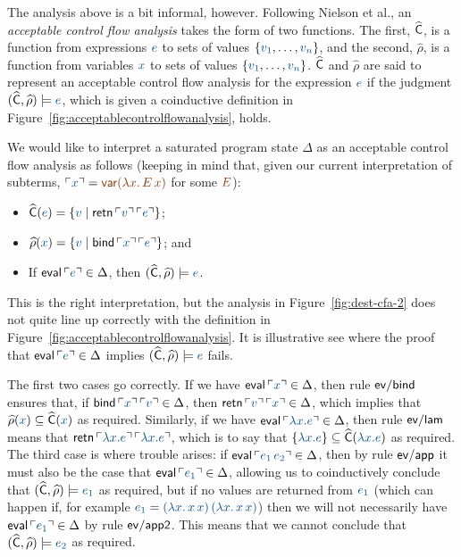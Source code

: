 The analysis above is a bit informal, however. Following Nielson et
al., an {\it acceptable control flow analysis} takes the form of two
functions. The first, $\widehat{\sf C}$, is a function from
expressions $\obj{e}$ to sets of values $\{\obj{v_1},
\ldots,\obj{v_n}\}$, and the second, $\widehat{\rho}$, is a function
from variables $\obj{x}$ to sets of values $\{\obj{v_1},
\ldots,\obj{v_n}\}$. $\widehat{\sf C}$ and $\widehat{\rho}$ are said
to represent an acceptable control flow analysis for the expression
$\obj{e}$ if the judgment $(\widehat{\sf C},\widehat{\rho}) \models
\obj{e}$, which is given a coinductive definition in
Figure~\ref{fig:acceptablecontrolflowanalysis}, holds.

We would like to interpret a saturated program state $\Delta$ as an
acceptable control flow analysis as follows (keeping in mind that,
given our current interpretation of subterms, $\interp{x} = \lf{{\sf
    var}(\lambda x.\,E\,x)}$ for some $\lf{E}$): \smallskip
\begin{itemize}
\item $\widehat{\sf C}(\obj{e}) = \{ \obj{v} \mid {\sf retn}\,\interp{v}\,\interp{e} \}$;
\item $\widehat{\rho}(\obj{x}) = \{ \obj{v} \mid {\sf bind}\,\interp{x}\,\interp{e} \}$; and
\item If ${\sf eval}\,\interp{e} \in \Delta$, then $(\widehat{\sf C},\widehat{\rho}) \models \obj{e}$.
\end{itemize}
\smallskip This is the right interpretation, but the analysis in
Figure~\ref{fig:dest-cfa-2} does not quite line up correctly with the
definition in Figure~\ref{fig:acceptablecontrolflowanalysis}. It is
illustrative see where the proof that ${\sf eval}\,\interp{e} \in
\Delta$ implies $(\widehat{\sf C},\widehat{\rho}) \models \obj{e}$
fails.

The first two cases go correctly. If we have ${\sf eval}\,\interp{x}
\in \Delta$, then rule ${\sf ev/bind}$ ensures that, if ${\sf
  bind}\,\interp{x}\,\interp{v} \in \Delta$, then ${\sf
  retn}\,\interp{v}\,\interp{x} \in \Delta$, which implies that
$\widehat{\rho}(\obj{x}) \subseteq \widehat{\sf C}(\obj{x})$ as
required.  Similarly, if we have ${\sf eval}\,\interp{\lambda x.e} \in
\Delta$, then rule ${\sf ev/lam}$ means that ${\sf
  retn}\,\interp{\lambda x.e}\,\interp{\lambda x.e}$, which is to say
that $\{\obj{\lambda x.e} \} \subseteq \widehat{\sf C}(\obj{\lambda
  x.e})$ as required. The third case is where trouble arises: if ${\sf
  eval}\,\interp{e_1\,e_2} \in \Delta$, then by rule ${\sf ev/app}$ it
must also be the case that ${\sf eval}\,\interp{e_1} \in \Delta$,
allowing us to coinductively conclude that $(\widehat{\sf
  C},\widehat{\rho}) \models \obj{e_1}$ as required, but if no values
are returned from $\obj{e_1}$ (which can happen if, for example $\obj{e_1} =
\obj{(\lambda x.\,x\,x)\,(\lambda x.\,x\,x)}$) then we will not
necessarily have  ${\sf eval}\,\interp{e_1} \in \Delta$ by rule
${\sf ev/app2}$. This means that we cannot conclude that 
$(\widehat{\sf
  C},\widehat{\rho}) \models \obj{e_2}$ as required. 

